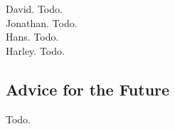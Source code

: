 David. Todo.\\

Jonathan. Todo.\\

Hans. Todo.\\

Harley. Todo.\\

\subsection{Advice for the Future}
Todo.\\